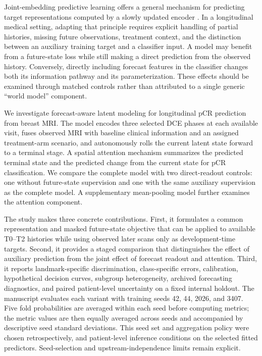 Joint-embedding predictive learning offers a general mechanism for predicting target representations computed by a slowly updated encoder \citep{jepa2023}. In a longitudinal medical setting, adapting that principle requires explicit handling of partial histories, missing future observations, treatment context, and the distinction between an auxiliary training target and a classifier input. A model may benefit from a future-state loss while still making a direct prediction from the observed history. Conversely, directly including forecast features in the classifier changes both its information pathway and its parameterization. These effects should be examined through matched controls rather than attributed to a single generic ``world model'' component.

We investigate forecast-aware latent modeling for longitudinal pCR prediction from breast MRI. The model encodes three selected DCE phases at each available visit, fuses observed MRI with baseline clinical information and an assigned treatment-arm scenario, and autonomously rolls the current latent state forward to a terminal stage. A spatial attention mechanism summarizes the predicted terminal state and the predicted change from the current state for pCR classification. We compare the complete model with two direct-readout controls: one without future-state supervision and one with the same auxiliary supervision as the complete model. A supplementary mean-pooling model further examines the attention component.

The study makes three concrete contributions. First, it formulates a common representation and masked future-state objective that can be applied to available T0--T2 histories while using observed later scans only as development-time targets. Second, it provides a staged comparison that distinguishes the effect of auxiliary prediction from the joint effect of forecast readout and attention. Third, it reports landmark-specific discrimination, class-specific errors, calibration, hypothetical decision curves, subgroup heterogeneity, archived forecasting diagnostics, and paired patient-level uncertainty on a fixed internal holdout. The manuscript evaluates each variant with training seeds 42, 44, 2026, and 3407. Five fold probabilities are averaged within each seed before computing metrics; the metric values are then equally averaged across seeds and accompanied by descriptive seed standard deviations. This seed set and aggregation policy were chosen retrospectively, and patient-level inference conditions on the selected fitted predictors. Seed-selection and upstream-independence limits remain explicit.

